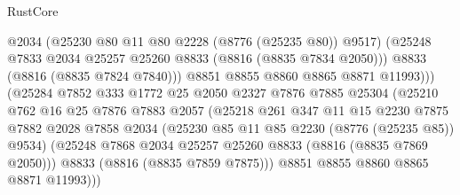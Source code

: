 \begin{lexlean}{RustCore}
\begin{coremodule}
                                    @2034
                                    (@25230 @80 @11 @80 @2228 (@8776 (@25235 @80)) @9517)
                                    (@25248
                                      @7833
                                      @2034
                                      @25257
                                      @25260
                                      @8833
                                      (@8816 (@8835 @7834 @2050)))
                                    @8833
                                    (@8816 (@8835 @7824 @7840)))
                                  @8851
                                  @8855
                                  @8860
                                  @8865
                                  @8871
                                  @11993)))
                            (@25284
                              @7852
                              @333
                              @1772
                              @25
                              @2050
                              @2327
                              @7876
                              @7885
                              @25304
                              (@25210
                                @762
                                @16
                                @25
                                @7876
                                @7883
                                @2057
                                (@25218
                                  @261
                                  @347
                                  @11
                                  @15
                                  @2230
                                  @7875
                                  @7882
                                  @2028
                                  @7858
                                  @2034
                                  (@25230 @85 @11 @85 @2230 (@8776 (@25235 @85)) @9534)
                                  (@25248
                                    @7868
                                    @2034
                                    @25257
                                    @25260
                                    @8833
                                    (@8816 (@8835 @7869 @2050)))
                                  @8833
                                  (@8816 (@8835 @7859 @7875)))
                                @8851
                                @8855
                                @8860
                                @8865
                                @8871
                                @11993)))

\end{coremodule}
\end{lexlean}
